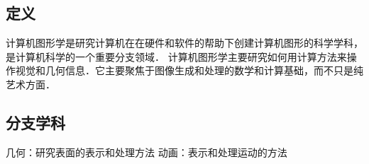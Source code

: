 
\subsection{定义}
计算机图形学是研究计算机在在硬件和软件的帮助下创建计算机图形的科学学科，是计算机科学的一个重要分支领域．
计算机图形学主要研究如何用计算方法来操作视觉和几何信息．它主要聚焦于图像生成和处理的数学和计算基础，而不只是纯艺术方面．

\subsection{分支学科}
几何：研究表面的表示和处理方法
动画：表示和处理运动的方法